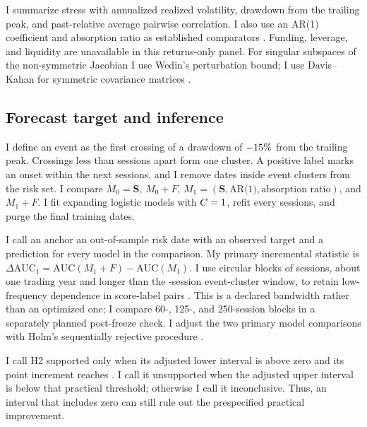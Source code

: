 \documentclass[11pt]{article}
\begin{document}
I summarize stress with annualized realized volatility, drawdown from the trailing peak, and past-relative average pairwise correlation. I also use an AR(1) coefficient and absorption ratio as established comparators \cite{Scheffer,Kritzman}. Funding, leverage, and liquidity are unavailable in this returns-only panel. For singular subspaces of the non-symmetric Jacobian I use Wedin's perturbation bound; I use Davis--Kahan for symmetric covariance matrices \cite{Wedin,DavisKahan}.

\subsection{Forecast target and inference}
I define an event as the first crossing of a drawdown of $-15\%$ from the trailing peak. Crossings less than \MergeDays{} sessions apart form one cluster. A positive label marks an onset within the next \ForecastDays{} sessions, and I remove dates inside event clusters from the risk set. I compare $M_0=\mathbf S$, $M_0+F$, $M_1=(\mathbf S,\text{AR(1)},\text{absorption ratio})$, and $M_1+F$. I fit expanding logistic models with $C=1$, refit every \RefitDays{} sessions, and purge the final \PurgeDays{} training dates.

I call an anchor an out-of-sample risk date with an observed target and a prediction for every model in the comparison. My primary incremental statistic is $\Delta\mathrm{AUC}_1=\mathrm{AUC}(M_1+F)-\mathrm{AUC}(M_1)$. I use circular blocks of \BootstrapBlock{} sessions, about one trading year and longer than the \MergeDays-session event-cluster window, to retain low-frequency dependence in score-label pairs \cite{Kunsch}. This is a declared bandwidth rather than an optimized one; I compare 60-, 125-, and 250-session blocks in a separately planned post-freeze check. I adjust the two primary model comparisons with Holm's sequentially rejective procedure \cite{Holm}.

I call H2 supported only when its adjusted lower interval is above zero and its point increment reaches \SupportThreshold. I call it unsupported when the adjusted upper interval is below that practical threshold; otherwise I call it inconclusive. Thus, an interval that includes zero can still rule out the prespecified practical improvement.
\end{document}
